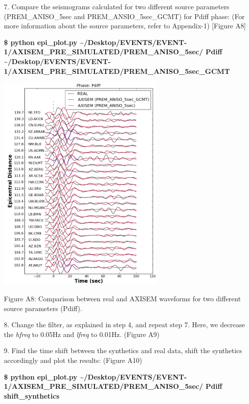 \documentclass{article}
\begin{document}
\baselineskip=13pt
\leftskip=0pt
7. Compare the seismograms calculated for two different source parameters (PREM\_ANISO\_5sec 
and PREM\_ANSIO\_5sec\_GCMT) for Pdiff phase: (For more information about the source 
parameters, refer to Appendix-1) [Figure A8]

\textbf{\$ python epi\_plot.py \textasciitilde{}/Desktop/EVENTS/EVENT-1/AXISEM\_PRE\_SIMULATED/PREM\_ANISO\_5sec/ 
Pdiff \textasciitilde{}/Desktop/EVENTS/EVENT-1/AXISEM\_PRE\_SIMULATED/PREM\_ANISO\_5sec\_GCMT}

\begin{center}
\includegraphics[width=234pt, height=310pt, keepaspectratio=true]{AXISEMTutorial-fig014.png}

{\small{}Figure A8: Comparison between real and AXISEM waveforms for two different 
source parameters (Pdiff).}
\end{center}

\baselineskip=13pt
\leftskip=0pt
8. Change the filter, as explained in step 4, and repeat step 7. Here, we decrease 
the \textit{hfreq} to 0.05Hz and \textit{lfreq} to 0.01Hz. (Figure A9)

9. Find the time shift between the synthetics and real data, shift the synthetics 
accordingly and plot the results: (Figure A10)

\textbf{\$ python epi\_plot.py \textasciitilde{}/Desktop/EVENTS/EVENT-1/AXISEM\_PRE\_SIMULATED/PREM\_ANISO\_5sec/ 
Pdiff shift\_synthetics}
\end{document}
